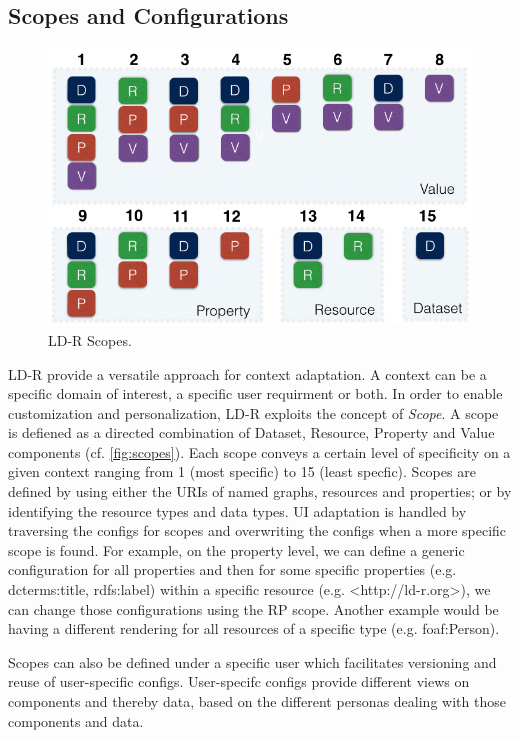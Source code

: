 \documentclass{acm_proc_article-sp}
\begin{document}

\subsection{Scopes and Configurations}

\begin{figure}[tb]
  \includegraphics[width=.9\linewidth]{images/scopes.jpg}
  \caption{LD-R Scopes.}
  \label{fig:scopes}
\end{figure}

LD-R provide a versatile approach for context adaptation.
A context can be a specific domain of interest, a specific user requirment or both.
In order to enable customization and personalization, LD-R exploits the concept of \emph{Scope}.
A scope is defiened as a directed combination of Dataset, Resource, Property and Value components (cf. \autoref{fig:scopes}).
Each scope conveys a certain level of specificity on a given context ranging from 1 (most specific) to 15 (least specfic).
Scopes are defined by using either the URIs of named graphs, resources and properties; or by identifying the resource types and data types.
UI adaptation is handled by traversing the configs for scopes and overwriting the configs when a more specific scope is found.
For example, on the property level, we can define a generic configuration for all properties and then for some specific properties (e.g. dcterms:title, rdfs:label) within a specific resource (e.g. <http://ld-r.org>), we can change those configurations using the RP scope.
Another example would be having a different rendering for all resources of a specific type (e.g. foaf:Person).

Scopes can also be defined under a specific user which facilitates versioning and reuse of user-specific configs.
User-specifc configs provide different views on components and thereby data, based on the different personas dealing with those components and data.
\end{document}
